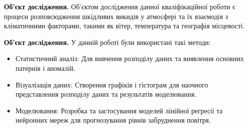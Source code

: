 {\bf{Об'єкт дослідження.}} 
Об'єктом дослідження данної кваліфікаційної роботи є процеси розповсюдження шкідливих викидів у атмосфері та їх взаємодія з кліматичними факторами, такими як вітер, температура та географія місцевості. 


{\bf{Об'єкт дослідження.}} 
У данній роботі були використані такі методи:
\begin{itemize}
    \item Статистичний аналіз: Для вивчення розподілу даних та виявлення основних патернів і аномалій.
    \item Візуалізація даних: Створення графіків і гістограм для наочного представлення розподілу даних та результатів моделювання.
    \item Моделювання: Розробка та застосування моделей лінійної регресії та нейронних мереж для прогнозування рівнів забруднення повітря.
\end{itemize}

